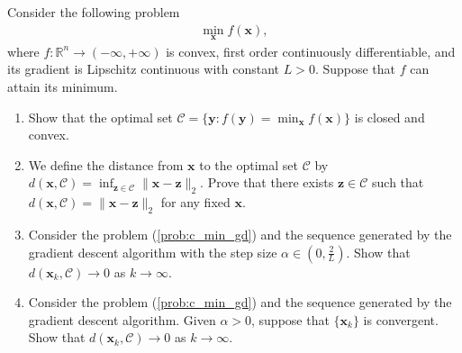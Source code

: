 \documentclass[11pt,letter,notitlepage]{article}
\begin{document}
\begin{exercise}
    Consider the following problem 
    \begin{align}\label{prob:c_min_gd}
        \min_{\mathbf{x}}f(\mathbf{x}),
    \end{align}
    where $f:\mathbb{R}^{n} \to \left( -\infty,+\infty \right)$ is convex, first order continuously differentiable, and its gradient is Lipschitz continuous with constant $L>0$. Suppose that $f$ can attain its minimum.
    \begin{enumerate}
    \item Show that the optimal set $\mathcal{C}=\{\mathbf{y}:f(\mathbf{y})=\min_{\mathbf{x}}f(\mathbf{x})\}$ is closed and convex.
    \item We define the distance from $\mathbf{x}$ to the optimal set $\mathcal{C}$ by $d(\mathbf{x},\mathcal{C})=\inf_{\mathbf{z}\in\mathcal{C}}\|\mathbf{x}-\mathbf{z}\|_2$. Prove that there exists $\mathbf{z}\in \mathcal{C}$ such that $d(\mathbf{x},\mathcal{C}) = \|\mathbf{x}-\mathbf{z}\|_2$ for any fixed $\mathbf{x}$.
    \item Consider the problem (\ref{prob:c_min_gd}) and the sequence generated by the gradient descent algorithm with the step size $\alpha \in (0,\frac{2}{L})$. Show that $d(\mathbf{x}_k,\mathcal{C})\rightarrow 0$ as $k\rightarrow\infty$. 
    \item Consider the problem (\ref{prob:c_min_gd}) and the sequence generated by the gradient descent algorithm. Given $\alpha >0$, suppose that  $\{\mathbf{x}_k\}$ is convergent. Show that $d(\mathbf{x}_k,\mathcal{C})\rightarrow 0$ as $k\rightarrow\infty$.   
\end{enumerate}
\end{exercise}
\begin{solution}

\end{solution}

\newpage
\end{document}
